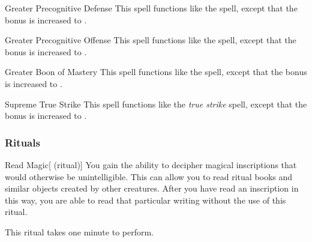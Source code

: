 \lowercase{\hypertarget{spell:Greater Precognitive Defense}{}}\label{spell:Greater Precognitive Defense}
\begin{ability}[\nth{4}]{\hypertarget{spell:Greater Precognitive Defense}{Greater Precognitive Defense}}
This spell functions like the  spell, except that the bonus is increased to .
\end{ability}
\vspace{0.25em}



\lowercase{\hypertarget{spell:Greater Precognitive Offense}{}}\label{spell:Greater Precognitive Offense}
\begin{ability}[\nth{4}]{\hypertarget{spell:Greater Precognitive Offense}{Greater Precognitive Offense}}
This spell functions like the  spell, except that the bonus is increased to .
\end{ability}
\vspace{0.25em}



\lowercase{\hypertarget{spell:Greater Boon of Mastery}{}}\label{spell:Greater Boon of Mastery}
\begin{ability}[\nth{5}]{\hypertarget{spell:Greater Boon of Mastery}{Greater Boon of Mastery}}
This spell functions like the  spell, except that the bonus is increased to .
\end{ability}
\vspace{0.25em}



\lowercase{\hypertarget{spell:Supreme True Strike}{}}\label{spell:Supreme True Strike}
\begin{ability}[\nth{5}]{\hypertarget{spell:Supreme True Strike}{Supreme True Strike}}
This spell functions like the \textit{true strike} spell, except that the bonus is increased to .
\end{ability}
\vspace{0.25em}



\subsubsection{Rituals}


\lowercase{\hypertarget{spell:Read Magic}{}}\label{spell:Read Magic}
\begin{ability}[\nth{1}]{\hypertarget{spell:Read Magic}{Read Magic}}[ (ritual)]
You gain the ability to decipher magical inscriptions that would otherwise be unintelligible.
This can allow you to read ritual books and similar objects created by other creatures.
After you have read an inscription in this way, you are able to read that particular writing without the use of this ritual.

This ritual takes one minute to perform.
\end{ability}
\vspace{0.25em}



